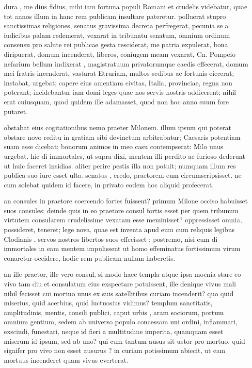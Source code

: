  dura , me dius fidius, mihi iam fortuna populi Romani et crudelis videbatur, quae tot annos illum in hanc rem publicam insultare pateretur. polluerat stupro sanctissimas religiones, senatus gravissima decreta perfregerat, pecunia se a iudicibus palam redemerat, vexarat in tribunatu senatum, omnium ordinum consensu pro salute rei publicae gesta resciderat, me patria expulerat, bona diripuerat, domum incenderat, liberos, coniugem meam vexarat, Cn. Pompeio nefarium bellum indixerat , magistratuum privatorumque caedis effecerat, domum mei fratris incenderat, vastarat Etruriam, multos sedibus ac fortunis eiecerat; instabat, urgebat; capere eius amentiam civitas, Italia, provinciae, regna non poterant; incidebantur iam domi leges quae nos servis nostris addicerent; nihil erat cuiusquam, quod quidem ille adamasset, quod non hoc anno suum fore putaret.

 obstabat eius cogitationibus nemo praeter Milonem. illum ipsum qui poterat obstare novo reditu in gratiam sibi devinctum arbitrabatur; Caesaris potentiam suam esse dicebat; bonorum animos in meo casu contempserat: Milo unus urgebat. hic di immortales, ut supra dixi, mentem illi perdito ac furioso dederunt ut huic faceret insidias. aliter perire pestis illa non potuit; numquam illum res publica suo iure esset ulta. senatus , credo, praetorem eum circumscripsisset. ne cum solebat quidem id facere, in privato eodem hoc aliquid profecerat.

 an consules in praetore coercendo fortes fuissent? primum Milone occiso habuisset suos consules; deinde quis in eo praetore consul fortis esset per quem tribunum virtutem consularem crudelissime vexatam esse meminisset? oppressisset omnia, possideret, teneret; lege nova, quae est inventa apud eum cum reliquis legibus Clodianis , servos nostros libertos suos effecisset ; postremo, nisi eum di immortales in eam mentem impulissent ut homo effeminatus fortissimum virum conaretur occidere, hodie rem publicam nullam haberetis.

 an ille praetor, ille vero consul, si modo haec templa atque ipsa moenia stare eo vivo tam diu et consulatum eius exspectare potuissent, ille denique vivus mali nihil fecisset cui mortuo unus ex suis satellitibus curiam incenderit? quo quid miserius, quid acerbius, quid luctuosius vidimus? templum sanctitatis, amplitudinis, mentis, consili publici, caput urbis , aram sociorum, portum omnium gentium, sedem ab universo populo concessam uni ordini, inflammari, exscindi, funestari, neque id fieri a multitudine imperita, quamquam esset miserum id ipsum, sed ab uno? qui cum tantum ausus sit ustor pro mortuo, quid signifer pro vivo non esset ausurus ? in curiam potissimum abiecit, ut eam mortuus incenderet quam vivus everterat.

